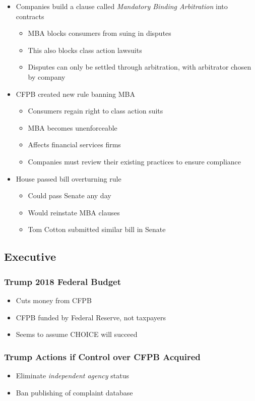 \documentclass[11pt]{article}
\begin{document}
\begin{itemize}
\item Companies build a clause called \emph{Mandatory Binding Arbitration} into contracts
\begin{itemize}
\item MBA blocks consumers from suing in disputes
\item This also blocks class action lawsuits
\item Disputes can only be settled through arbitration, with arbitrator chosen by company
\end{itemize}
\item CFPB created new rule banning MBA
\begin{itemize}
\item Consumers regain right to class action suits
\item MBA becomes unenforceable
\item Affects financial services firms
\item Companies must review their existing practices to ensure compliance
\end{itemize}
\item House passed bill overturning rule
\begin{itemize}
\item Could pass Senate any day
\item Would reinstate MBA clauses
\item Tom Cotton submitted similar bill in Senate
\end{itemize}
\end{itemize}

\subsection{Executive}
\label{sec:org17c90e1}

\subsubsection{Trump 2018 Federal Budget}
\label{sec:org2524d77}

\begin{itemize}
\item Cuts money from CFPB
\item CFPB funded by Federal Reserve, not taxpayers
\item Seems to assume CHOICE will succeed
\end{itemize}

\subsubsection{Trump Actions if Control over CFPB Acquired}
\label{sec:org8c41163}

\begin{itemize}
\item Eliminate \emph{independent agency} status
\item Ban publishing of complaint database
\end{itemize}
\end{document}
